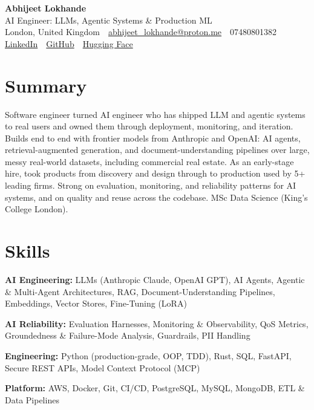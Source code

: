 \documentclass[10pt,a4paper]{article}
\newcommand{\sep}{\,\textcolor{accent!60}{\textbar}\,}
\begin{document}
\begin{center}
  {\fontsize{24}{26}\selectfont\bfseries Abhijeet Lokhande}\\[3pt]
  {\color{accent}\large AI Engineer: LLMs, Agentic Systems \& Production ML}\\[5pt]
  {\small
    London, United Kingdom \sep
    \href{mailto:abhijeet_lokhande@proton.me}{abhijeet\_lokhande@proton.me} \sep
    07480801382 \\[2pt]
    \href{https://www.linkedin.com/in/ablds/}{LinkedIn} \sep
    \href{https://github.com/abhijeetscode}{GitHub} \sep
    \href{https://huggingface.co/ab-ai}{Hugging Face}
  }
\end{center}
\vspace{2pt}

\section{Summary}
Software engineer turned AI engineer who has shipped LLM and agentic systems to real users and owned them through deployment, monitoring, and iteration. Builds end to end with frontier models from Anthropic and OpenAI: AI agents, retrieval-augmented generation, and document-understanding pipelines over large, messy real-world datasets, including commercial real estate. As an early-stage hire, took products from discovery and design through to production used by 5+ leading firms. Strong on evaluation, monitoring, and reliability patterns for AI systems, and on quality and reuse across the codebase. MSc Data Science (King's College London).

\section{Skills}
\begin{tight}
  \item[\textcolor{accent}{\small$\bullet$}] \textbf{AI Engineering:} LLMs (Anthropic Claude, OpenAI GPT), AI Agents, Agentic \& Multi-Agent Architectures, RAG, Document-Understanding Pipelines, Embeddings, Vector Stores, Fine-Tuning (LoRA)
  \item[\textcolor{accent}{\small$\bullet$}] \textbf{AI Reliability:} Evaluation Harnesses, Monitoring \& Observability, QoS Metrics, Groundedness \& Failure-Mode Analysis, Guardrails, PII Handling
  \item[\textcolor{accent}{\small$\bullet$}] \textbf{Engineering:} Python (production-grade, OOP, TDD), Rust, SQL, FastAPI, Secure REST APIs, Model Context Protocol (MCP)
  \item[\textcolor{accent}{\small$\bullet$}] \textbf{Platform:} AWS, Docker, Git, CI/CD, PostgreSQL, MySQL, MongoDB, ETL \& Data Pipelines
\end{tight}
\end{document}

